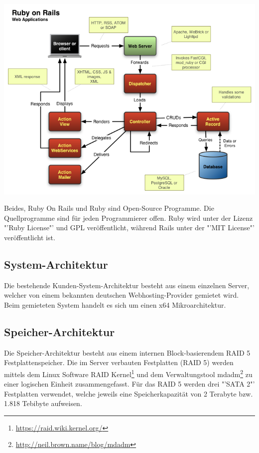 \begin{center}
\includegraphics[width=\linewidth, keepaspectratio = true]{media/rails-architecture.png}
\end{center}

Beides, Ruby On Rails und Ruby sind Open-Source Programme. Die Quellprogramme sind für jeden Programmierer offen. Ruby wird unter der Lizenz "'Ruby License"' und GPL veröffentlicht, während Rails unter der "'MIT License"' veröffentlicht ist.

\subsection{System-Architektur}\label{System-Architektur}
Die bestehende Kunden-System-Architektur besteht aus einem einzelnen Server, welcher von einem bekannten deutschen Webhosting-Provider gemietet wird. Beim gemieteten System handelt es sich um einen x64 Mikroarchitektur.

\subsection{Speicher-Architektur}
Die Speicher-Architektur besteht aus einem internen Block-basierendem RAID 5 Festplattenspeicher. Die im Server verbauten Festplatten (RAID 5) werden mittels dem Linux Software RAID Kernel\footnote{\url{https://raid.wiki.kernel.org/}} und dem Verwaltungstool mdadm\footnote{\url{http://neil.brown.name/blog/mdadm}} zu einer logischen Einheit zusammengefasst. Für das RAID 5 werden drei  "'SATA 2"' Festplatten verwendet, welche jeweils eine Speicherkapazität von 2 Terabyte bzw. 1.818 Tebibyte aufweisen.

